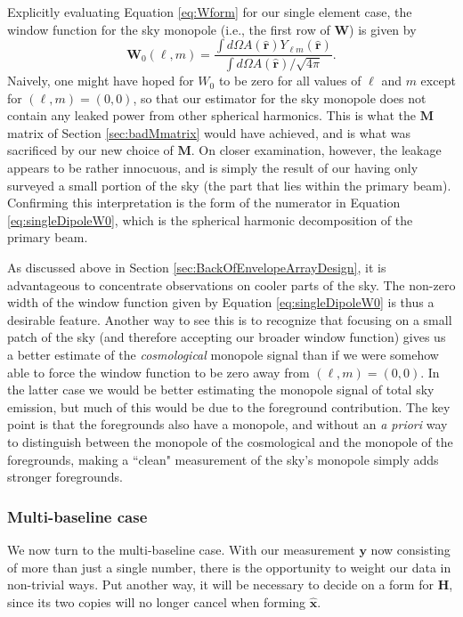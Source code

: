 \documentclass[twocolumn,apj,numberedappendix]{emulateapj}
\newcommand{\xhat}{\hat{\mathbf{x}}}
\newcommand{\Hmat}{\mathbf{H}}
\newcommand{\M}{\mathbf{M}}
\newcommand{\W}{\mathbf{W}}
\begin{document}
Explicitly evaluating Equation \eqref{eq:Wform} for our single element case, the window function for the sky monopole (i.e., the first row of $\W$) is given by
\begin{equation}
\W_{0}(\ell,m) = \frac{\int d\Omega A(\mathbf{\hat{r}}) Y_{\ell m} (\mathbf{\hat{r}})}{\int d\Omega A(\mathbf{\hat{r}}) / \sqrt{4 \pi}}.
\label{eq:singleDipoleW0}
\end{equation}
Naively, one might have hoped for $W_0$ to be zero for all values of $\ell$ and $m$ except for $(\ell, m) = (0,0)$, so that our estimator for the sky monopole does not contain any leaked power from other spherical harmonics. This is what the $\M$ matrix of Section \ref{sec:badMmatrix} would have achieved, and is what was sacrificed by our new choice of $\M$. On closer examination, however, the leakage appears to be rather innocuous, and is simply the result of our having only surveyed a small portion of the sky (the part that lies within the primary beam). Confirming this interpretation is the form of the numerator in Equation \eqref{eq:singleDipoleW0}, which is the spherical harmonic decomposition of the primary beam.

As discussed above in Section \ref{sec:BackOfEnvelopeArrayDesign}, it is advantageous to concentrate observations on cooler parts of the sky. The non-zero width of the window function given by Equation \eqref{eq:singleDipoleW0} is thus a desirable feature. Another way to see this is to recognize that focusing on a small patch of the sky (and therefore accepting our broader window function) gives us a better estimate of the \emph{cosmological} monopole signal than if we were somehow able to force the window function to be zero away from $(\ell,m) = (0,0)$. In the latter case we would be better estimating the monopole signal of total sky emission, but much of this would be due to the foreground contribution. The key point is that the foregrounds also have a monopole, and without an \emph{a priori} way to distinguish between the monopole of the cosmological and the monopole of the foregrounds, making a ``clean" measurement of the sky's monopole simply adds stronger foregrounds.

\subsubsection{Multi-baseline case}
\label{sec:MultiBaselineWorkedExample}
We now turn to the multi-baseline case. With our measurement $\mathbf{y}$ now consisting of more than just a single number, there is the opportunity to weight our data in non-trivial ways. Put another way, it will be necessary to decide on a form for $\Hmat$, since its two copies will no longer cancel when forming $\xhat$.
\end{document}
